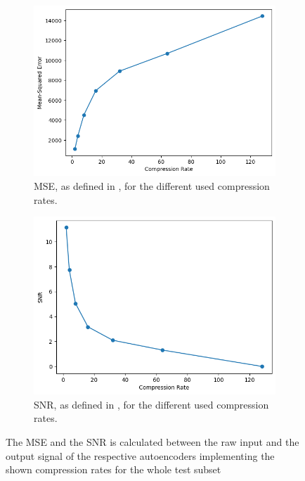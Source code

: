\begin{figure}[h]
	\begin{subfigure}{.48\textwidth}
		\centering
		\includegraphics[width=1\linewidth]{../../Images/mse.png}
		\caption{MSE, as defined in , for the different used compression rates.}
		\label{fig:mse}
	\end{subfigure} \hfill
	\begin{subfigure}{.48\textwidth}
		\centering
		\includegraphics[width=1\linewidth]{../../Images/snr.png}
		\caption{SNR, as defined in , for the different used compression rates.}
		\label{fig:snr}
	\end{subfigure}
\caption{The MSE and the SNR is calculated between the raw input and the output signal of the respective autoencoders implementing the shown compression rates for the whole test subset}
\label{fig:msesnr}
\end{figure}
\FloatBarrier

